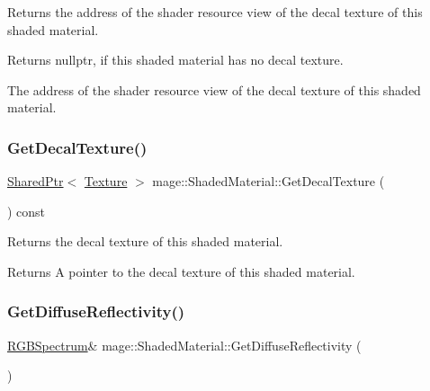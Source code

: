 Returns the address of the shader resource view of the decal texture of this shaded material.

\begin{DoxyReturn}{Returns}
{\ttfamily nullptr}, if this shaded material has no decal texture. 

The address of the shader resource view of the decal texture of this shaded material. 
\end{DoxyReturn}
\hypertarget{structmage_1_1_shaded_material_affd31417050c3fa426791fa521c03fc9}{}\label{structmage_1_1_shaded_material_affd31417050c3fa426791fa521c03fc9} 
\subsubsection{\texorpdfstring{Get\+Decal\+Texture()}{GetDecalTexture()}}
{\footnotesize\ttfamily \hyperlink{namespacemage_a1e01ae66713838a7a67d30e44c67703e}{Shared\+Ptr}$<$ \hyperlink{classmage_1_1_texture}{Texture} $>$ mage\+::\+Shaded\+Material\+::\+Get\+Decal\+Texture (\begin{DoxyParamCaption}{ }\end{DoxyParamCaption}) const\hspace{0.3cm}{\ttfamily [noexcept]}}

Returns the decal texture of this shaded material.

\begin{DoxyReturn}{Returns}
A pointer to the decal texture of this shaded material. 
\end{DoxyReturn}
\hypertarget{structmage_1_1_shaded_material_a3e292664418846588d1e5cdc9ddc8ab5}{}\label{structmage_1_1_shaded_material_a3e292664418846588d1e5cdc9ddc8ab5} 
\subsubsection{\texorpdfstring{Get\+Diffuse\+Reflectivity()}{GetDiffuseReflectivity()}\hspace{0.1cm}{\footnotesize\ttfamily [1/2]}}
{\footnotesize\ttfamily \hyperlink{structmage_1_1_r_g_b_spectrum}{R\+G\+B\+Spectrum}\& mage\+::\+Shaded\+Material\+::\+Get\+Diffuse\+Reflectivity (\begin{DoxyParamCaption}{ }\end{DoxyParamCaption})\hspace{0.3cm}{\ttfamily [noexcept]}}

